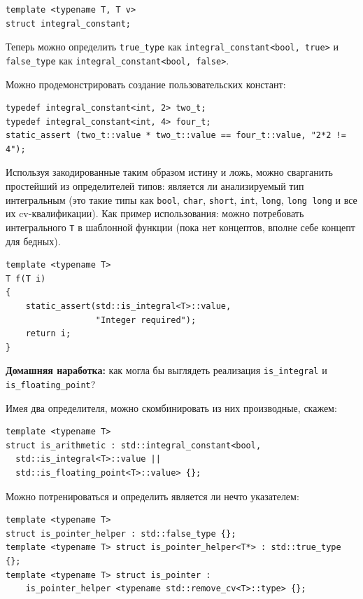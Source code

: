 \documentclass[a4paper,12pt,oneside]{article}
\begin{document}
\begin{lstlisting}
template <typename T, T v>
struct integral_constant;
\end{lstlisting}

Теперь можно определить \lstinline!true_type! как \lstinline!integral_constant<bool, true>! и \lstinline!false_type! как \lstinline!integral_constant<bool, false>!.

Можно продемонстрировать создание пользовательских констант:

\begin{lstlisting}
typedef integral_constant<int, 2> two_t;
typedef integral_constant<int, 4> four_t;
static_assert (two_t::value * two_t::value == four_t::value, "2*2 != 4");
\end{lstlisting}

Используя закодированные таким образом истину и ложь, можно сварганить простейший из определителей типов: является ли анализируемый тип интегральным (это такие типы как \lstinline!bool!, \lstinline!char!, \lstinline!short!, \lstinline!int!, \lstinline!long!, \lstinline!long long! и все их cv-квалификации). Как пример использования: можно потребовать интегрального \lstinline!T! в шаблонной функции (пока нет концептов, вполне себе концепт для бедных).

\begin{lstlisting}
template <typename T>
T f(T i)
{
    static_assert(std::is_integral<T>::value, 
                  "Integer required");
    return i;
}
\end{lstlisting}

\textbf{Домашняя наработка:} как могла бы выглядеть реализация \lstinline!is_integral! и \lstinline!is_floating_point!?

Имея два определителя, можно скомбинировать из них производные, скажем:

\begin{lstlisting}
template <typename T>
struct is_arithmetic : std::integral_constant<bool,
  std::is_integral<T>::value ||
  std::is_floating_point<T>::value> {};
\end{lstlisting}

Можно потренироваться и определить является ли нечто указателем:

\begin{lstlisting}
template <typename T> 
struct is_pointer_helper : std::false_type {};
template <typename T> struct is_pointer_helper<T*> : std::true_type {};
template <typename T> struct is_pointer : 
    is_pointer_helper <typename std::remove_cv<T>::type> {};
\end{lstlisting}
\end{document}
